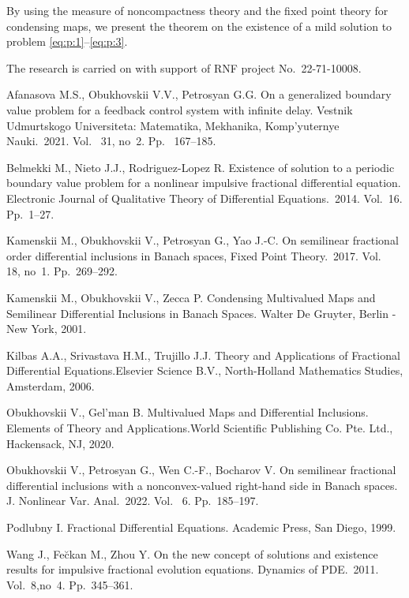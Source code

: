 \documentclass[12pt]{llncs}
\begin{document}
By using the measure of noncompactness theory and the fixed point theory for condensing maps, we present the theorem on the existence of a mild solution to problem  \eqref{eq:p:1}--\eqref{eq:p:3}.


The research is carried on with support of RNF project No.~22-71-10008.

\begin{thebibliography}{9} %

  Afanasova M.S.,  Obukhovskii V.V., Petrosyan G.G. On a generalized boundary value problem for a feedback control system with infinite delay. Vestnik Udmurtskogo Universiteta: Matematika, Mekhanika, Komp'yuternye Nauki.~2021. Vol.~ 31, no~2. Pp.~ 167--185.


  Belmekki M.,  Nieto J.J.,  Rodriguez-Lopez R. Existence of solution to a periodic boundary value problem for a nonlinear impulsive fractional differential equation. Electronic Journal of Qualitative Theory of Differential Equations.~2014. Vol.~16. Pp.~1--27.

  Kamenskii M.,  Obukhovskii V.,  Petrosyan G.,  Yao J.-C. On semilinear fractional order differential inclusions in Banach spaces, Fixed Point Theory.~2017. Vol.~ 18, no~1. Pp.~269--292.

 Kamenskii M., Obukhovskii V., Zecca P. Condensing Multivalued Maps and Semilinear Differential Inclusions in Banach Spaces. Walter De Gruyter, Berlin - New York, 2001.

 Kilbas A.A.,  Srivastava H.M.,  Trujillo J.J.  Theory and
Applications of Fractional Differential Equations.Elsevier Science B.V., North-Holland Mathematics Studies, Amsterdam, 2006.

   Obukhovskii V.,  Gel'man B. Multivalued Maps and Differential Inclusions. Elements of Theory and Applications.World Scientific Publishing Co. Pte. Ltd., Hackensack, NJ, 2020.

   Obukhovskii V.,  Petrosyan G.,  Wen C.-F.,  Bocharov V. On semilinear fractional differential inclusions with a nonconvex-valued right-hand side in Banach spaces. J. Nonlinear Var. Anal.~2022. Vol.~ 6. Pp.~185--197.

  Podlubny I. Fractional Differential Equations. Academic Press, San Diego, 1999.


  Wang J.,  Fe\u{c}kan M., Zhou Y. On the new concept of solutions and existence results for impulsive fractional evolution equations. Dynamics of PDE.~2011. Vol.~8,no~4. Pp.~345--361.

\end{thebibliography}

\end{document}
